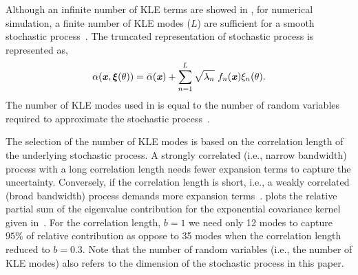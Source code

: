 \documentclass[letter,1p,11pt,oneside,onecolumn,sort&compress]{elsarticle}
\begin{document}
Although an infinite number of KLE terms are showed in , for numerical simulation, a finite number of KLE modes ($L$) are sufficient for a smooth stochastic process~\cite{ghanemSFEM1991,le2010spectral}.
The truncated representation of stochastic process is represented as,
\begin{equation}\label{eq:truncatedKLE}
\alpha (\textbf{\textit{x}},  {\bxi}(\theta)) = \bar{\alpha}(\textbf{\textit{x}}) + \sum^{L}_{n=1} \sqrt{{\lambda}_n} \ f_n(\textbf{\textit{x}}) {\xi_{n}}(\theta).
\end{equation}
The number of KLE modes used in  is equal to the number of random variables required to approximate the stochastic process~\cite{ghanemSFEM1991,ghanem1999ingredients}.

The selection of the number of KLE modes is based on the correlation length of the underlying stochastic process. A strongly correlated (i.e., narrow bandwidth) process with a long correlation length needs fewer expansion terms to capture the uncertainty. Conversely, if the correlation length is short, i.e., a weakly correlated (broad bandwidth) process demands more expansion terms~\cite{ghanemSFEM1991,le2010spectral,xiuNMSC2010}.
 plots the relative partial sum of the eigenvalue contribution for the exponential covariance kernel given in~. For the correlation length, $b=1$ we need only 12 modes to capture $95\%$ of relative contribution as oppose to 35 modes when the correlation length reduced to $b=0.3$. Note that the number of random variables (i.e., the number of KLE modes) also refers to the dimension of the stochastic process in this paper.
\end{document}

